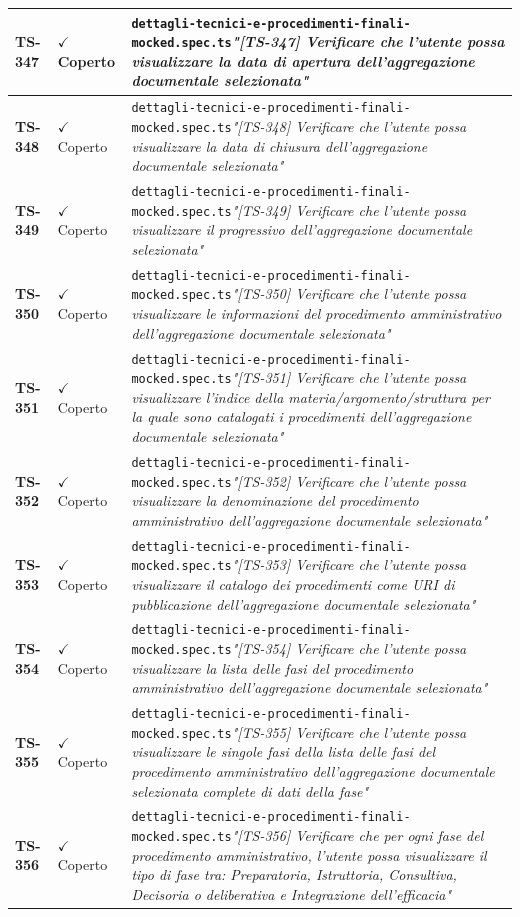 \documentclass[a4paper,12pt]{article}
\newcommand{\ok}{\textcolor{green!60!black}{$\checkmark$ Coperto}}
\newcommand{\f}[1]{\nolinkurl{#1}\newline}
\newcommand{\q}[1]{\textit{#1}}
\begin{document}
\begin{longtable}{|p{1.5cm}|p{3.0cm}|p{10.5cm}|}
\textbf{TS-347} & \ok & \f{dettagli-tecnici-e-procedimenti-finali-mocked.spec.ts}\q{"[TS-347] Verificare che l'utente possa visualizzare la data di apertura dell'aggregazione documentale selezionata"} \\ \hline
\textbf{TS-348} & \ok & \f{dettagli-tecnici-e-procedimenti-finali-mocked.spec.ts}\q{"[TS-348] Verificare che l'utente possa visualizzare la data di chiusura dell'aggregazione documentale selezionata"} \\ \hline
\textbf{TS-349} & \ok & \f{dettagli-tecnici-e-procedimenti-finali-mocked.spec.ts}\q{"[TS-349] Verificare che l'utente possa visualizzare il progressivo dell'aggregazione documentale selezionata"} \\ \hline
\textbf{TS-350} & \ok & \f{dettagli-tecnici-e-procedimenti-finali-mocked.spec.ts}\q{"[TS-350] Verificare che l'utente possa visualizzare le informazioni del procedimento amministrativo dell'aggregazione documentale selezionata"} \\ \hline
\textbf{TS-351} & \ok & \f{dettagli-tecnici-e-procedimenti-finali-mocked.spec.ts}\q{"[TS-351] Verificare che l'utente possa visualizzare l'indice della materia/argomento/struttura per la quale sono catalogati i procedimenti dell'aggregazione documentale selezionata"} \\ \hline
\textbf{TS-352} & \ok & \f{dettagli-tecnici-e-procedimenti-finali-mocked.spec.ts}\q{"[TS-352] Verificare che l'utente possa visualizzare la denominazione del procedimento amministrativo dell'aggregazione documentale selezionata"} \\ \hline
\textbf{TS-353} & \ok & \f{dettagli-tecnici-e-procedimenti-finali-mocked.spec.ts}\q{"[TS-353] Verificare che l'utente possa visualizzare il catalogo dei procedimenti come URI di pubblicazione dell'aggregazione documentale selezionata"} \\ \hline
\textbf{TS-354} & \ok & \f{dettagli-tecnici-e-procedimenti-finali-mocked.spec.ts}\q{"[TS-354] Verificare che l'utente possa visualizzare la lista delle fasi del procedimento amministrativo dell'aggregazione documentale selezionata"} \\ \hline
\textbf{TS-355} & \ok & \f{dettagli-tecnici-e-procedimenti-finali-mocked.spec.ts}\q{"[TS-355] Verificare che l'utente possa visualizzare le singole fasi della lista delle fasi del procedimento amministrativo dell'aggregazione documentale selezionata complete di dati della fase"} \\ \hline
\textbf{TS-356} & \ok & \f{dettagli-tecnici-e-procedimenti-finali-mocked.spec.ts}\q{"[TS-356] Verificare che per ogni fase del procedimento amministrativo, l'utente possa visualizzare il tipo di fase tra: Preparatoria, Istruttoria, Consultiva, Decisoria o deliberativa e Integrazione dell'efficacia"} \\ \hline

\end{longtable}
\end{document}
